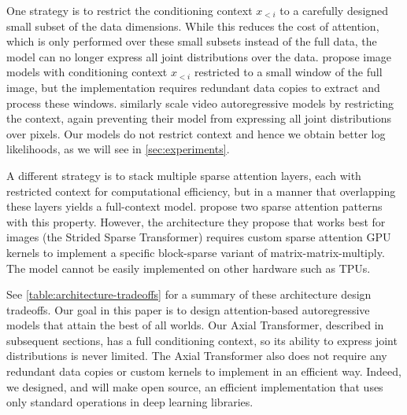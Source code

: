\documentclass{article} \usepackage{iclr2020_conference,times}
\begin{document}
One strategy is to restrict the conditioning context $x_{<i}$ to a carefully designed small subset of the data dimensions. While this reduces the cost of attention, which is only performed over these small subsets instead of the full data, the model can no longer  express all joint distributions over the data. \citet{parmar2018image} propose image models with conditioning context $x_{<i}$ restricted to a small window of the full image, but the implementation requires redundant data copies to extract and process these windows. \citet{weissenborn2019scaling} similarly scale video autoregressive models by restricting the context, again preventing their model from expressing all joint distributions over pixels. Our models do not restrict context and hence we obtain better log likelihoods, as we will see in \cref{sec:experiments}.

A different strategy is to stack multiple sparse attention layers, each with restricted context for computational efficiency, but in a manner that overlapping these layers yields a full-context model. \citet{child2019generating} propose two sparse attention patterns with this property. However, the architecture they propose that works best for images (the Strided Sparse Transformer) requires custom sparse attention GPU kernels to implement a specific block-sparse variant of matrix-matrix-multiply. The model cannot be easily implemented on other hardware such as TPUs.

See \cref{table:architecture-tradeoffs} for a summary of these architecture design tradeoffs. Our goal in this paper is to design attention-based autoregressive models that attain the best of all worlds. Our Axial Transformer, described in subsequent sections, has a full conditioning context, so its ability to express joint distributions is never limited. The Axial Transformer also does not require any redundant data copies or custom kernels to implement in an efficient way. Indeed, we designed, and will make open source, an efficient implementation that uses only standard operations in deep learning libraries.
\end{document}
